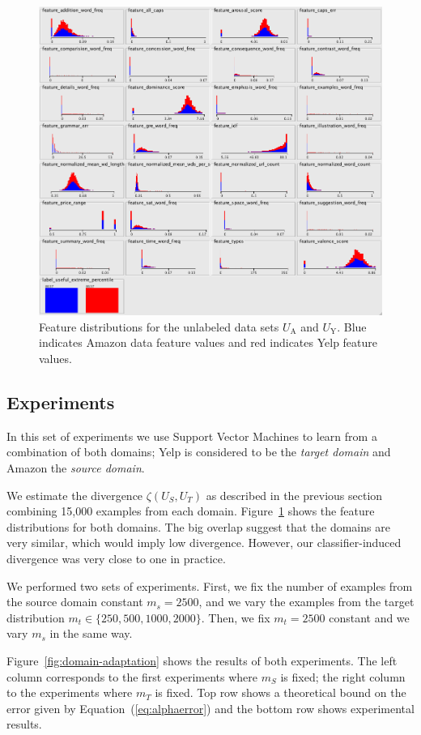 \documentclass[letterpaper]{article}
\begin{document}
\begin{figure}[h]
	\centering
	\includegraphics[width=0.75\linewidth]{adaptation_unlabeled_features}
	\caption{Feature distributions for the unlabeled data sets $U_{\textrm{A}}$ and $U_{\textrm{Y}}$.  
	Blue indicates Amazon data feature values and red indicates Yelp feature values.}
      \label{fig:dist}
\end{figure}

\subsection{Experiments}
\label{sec:domain-adaptation}

In this set of experiments we use Support Vector Machines to learn
from a combination of both domains; Yelp is considered to be the
\emph{target domain} and Amazon the \emph{source domain}.

We estimate the divergence $\zeta(U_S,U_T)$ as described in the
previous section combining 15,000 examples from each
domain. Figure~\ref{fig:dist} shows the feature distributions for both
domains. The big overlap suggest that the domains are very similar,
which would imply low divergence. However, our classifier-induced
divergence was very close to one in practice.

We performed two sets of experiments. First, we fix the number of
examples from the source domain constant $m_s=2500$, and we vary the
examples from the target distribution $m_t \in \{250, 500, 1000,
2000\}$. Then, we fix $m_t=2500$ constant and we vary $m_s$ in the
same way. 

Figure~\ref{fig:domain-adaptation} shows the results of both
experiments. The left column corresponds to the first experiments where
$m_S$ is fixed; the right column to the experiments where $m_T$ is
fixed. Top row shows a theoretical bound on the error given by
Equation~(\ref{eq:alphaerror}) and the bottom row shows experimental
results.
\end{document}

